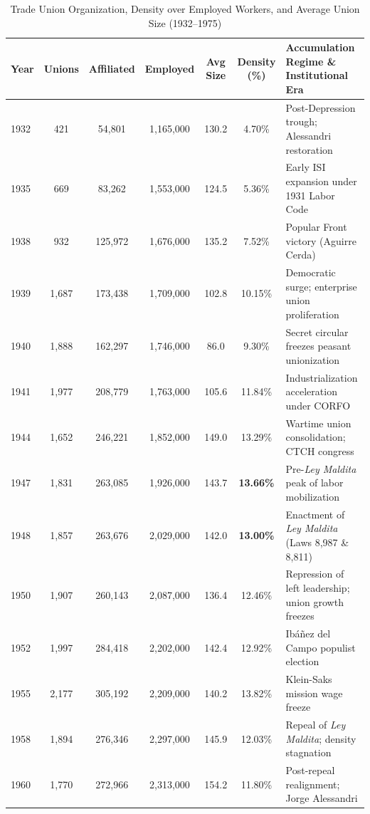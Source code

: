 \begin{table}[htbp]
\centering
\footnotesize
\setlength{\tabcolsep}{3.5pt}
\renewcommand{\arraystretch}{0.90}
\caption{Trade Union Organization, Density over Employed Workers, and Average Union Size (1932--1975)}
\label{tab:union_density_osorio_polanco}
\begin{tabularx}{\textwidth}{lcccccX}
\toprule
\textbf{Year} & \textbf{Unions} & \textbf{Affiliated} & \textbf{Employed} & \textbf{Avg Size} & \textbf{Density (\%)} & \textbf{Accumulation Regime \& Institutional Era} \\
\midrule
1932 & 421 & 54,801 & 1,165,000 & 130.2 & 4.70\% & Post-Depression trough; Alessandri restoration \\
1935 & 669 & 83,262 & 1,553,000 & 124.5 & 5.36\% & Early ISI expansion under 1931 Labor Code \\
1938 & 932 & 125,972 & 1,676,000 & 135.2 & 7.52\% & Popular Front victory (Aguirre Cerda) \\
1939 & 1,687 & 173,438 & 1,709,000 & 102.8 & 10.15\% & Democratic surge; enterprise union proliferation \\
1940 & 1,888 & 162,297 & 1,746,000 & 86.0 & 9.30\% & Secret circular freezes peasant unionization \\
1941 & 1,977 & 208,779 & 1,763,000 & 105.6 & 11.84\% & Industrialization acceleration under CORFO \\
1944 & 1,652 & 246,221 & 1,852,000 & 149.0 & 13.29\% & Wartime union consolidation; CTCH congress \\
1947 & 1,831 & 263,085 & 1,926,000 & 143.7 & \textbf{13.66\%} & Pre-\textit{Ley Maldita} peak of labor mobilization \\
1948 & 1,857 & 263,676 & 2,029,000 & 142.0 & \textbf{13.00\%} & Enactment of \textit{Ley Maldita} (Laws 8,987 \& 8,811) \\
1950 & 1,907 & 260,143 & 2,087,000 & 136.4 & 12.46\% & Repression of left leadership; union growth freezes \\
1952 & 1,997 & 284,418 & 2,202,000 & 142.4 & 12.92\% & Ibáñez del Campo populist election \\
1955 & 2,177 & 305,192 & 2,209,000 & 140.2 & 13.82\% & Klein-Saks mission wage freeze \\
1958 & 1,894 & 276,346 & 2,297,000 & 145.9 & 12.03\% & Repeal of \textit{Ley Maldita}; density stagnation \\
1960 & 1,770 & 272,966 & 2,313,000 & 154.2 & 11.80\% & Post-repeal realignment; Jorge Alessandri \\

\end{tabularx}
\end{table}
